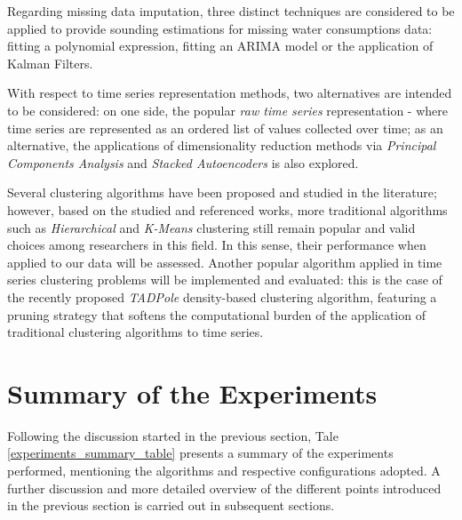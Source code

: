 \documentclass[9pt,journal,compsoc]{IEEEtran}
\begin{document}
Regarding missing data imputation, three distinct techniques are considered to be applied to provide sounding estimations for missing water consumptions data: fitting a polynomial expression, fitting an ARIMA model or the application of Kalman Filters.

With respect to time series representation methods, two alternatives are intended to be considered: on one side, the popular \emph{raw time series} representation - where time series are represented as an ordered list of values collected over time; as an alternative, the applications of dimensionality reduction methods via \emph{Principal Components Analysis} and \emph{Stacked Autoencoders} is also explored.
	
Several clustering algorithms have been proposed and studied in the literature; however, based on the studied and referenced works, more traditional algorithms such as \emph{Hierarchical} and \emph{K-Means} clustering still remain popular and valid choices among researchers in this field. In this sense, their performance when applied to our data will be assessed. Another popular algorithm applied in time series clustering problems will be implemented and evaluated: this is the case of the recently proposed \emph{TADPole}\cite{begum2015accelerating} density-based clustering algorithm, featuring a pruning strategy that softens the computational burden of the application of traditional clustering algorithms to time series.

\section{Summary of the Experiments}
\label{experiments_summary}

Following the discussion started in the previous section, Tale \ref{experiments_summary_table} presents a summary of the experiments performed, mentioning the algorithms and respective configurations adopted. A further discussion and more detailed overview of the different points introduced in the previous section is carried out in subsequent sections.
\end{document}

